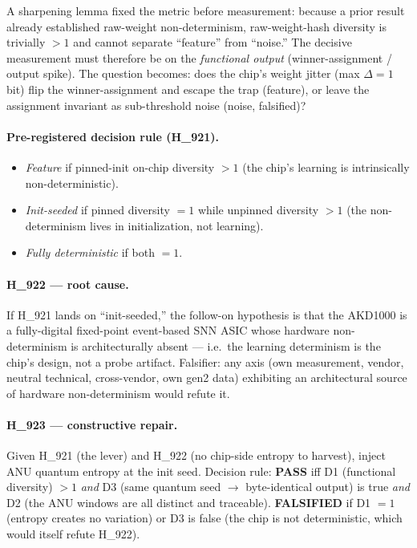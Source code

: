 \documentclass[11pt,a4paper]{article}
\begin{document}
A sharpening lemma fixed the metric before measurement: because a prior
result already established raw-weight non-determinism, raw-weight-hash
diversity is trivially \(>1\) and cannot separate ``feature'' from
``noise.'' The decisive measurement must therefore be on the
\emph{functional output} (winner-assignment / output spike). The question
becomes: does the chip's weight jitter (max \(\Delta = 1\) bit) flip the
winner-assignment and escape the trap (feature), or leave the assignment
invariant as sub-threshold noise (noise, falsified)?

\paragraph{Pre-registered decision rule (H\_921).}
\begin{itemize}\itemsep0.2em
\item \emph{Feature} if pinned-init on-chip diversity \(>1\) (the chip's
learning is intrinsically non-deterministic).
\item \emph{Init-seeded} if pinned diversity \(=1\) while unpinned
diversity \(>1\) (the non-determinism lives in initialization, not
learning).
\item \emph{Fully deterministic} if both \(=1\).
\end{itemize}

\paragraph{H\_922 --- root cause.} If H\_921 lands on ``init-seeded,'' the
follow-on hypothesis is that the AKD1000 is a fully-digital fixed-point
event-based SNN ASIC whose hardware non-determinism is architecturally
absent --- i.e.\ the learning determinism is the chip's design, not a probe
artifact. Falsifier: any axis (own measurement, vendor, neutral technical,
cross-vendor, own gen2 data) exhibiting an architectural source of hardware
non-determinism would refute it.

\paragraph{H\_923 --- constructive repair.} Given H\_921 (the lever) and
H\_922 (no chip-side entropy to harvest), inject ANU quantum entropy at the
init seed. Decision rule: \textbf{PASS} iff D1 (functional diversity)
\(>1\) \emph{and} D3 (same quantum seed \(\rightarrow\) byte-identical
output) is true \emph{and} D2 (the ANU windows are all distinct and
traceable). \textbf{FALSIFIED} if D1 \(=1\) (entropy creates no variation)
or D3 is false (the chip is not deterministic, which would itself refute
H\_922).
\end{document}
